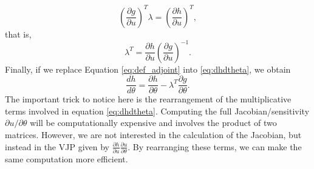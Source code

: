 \begin{equation}
    \left( \frac{\partial g}{\partial u}\right)^T \lambda =  \left( \frac{\partial h}{\partial u} \right)^T,
\end{equation}
that is,
\begin{equation}
    \lambda^T = \frac{\partial h}{\partial u} \left( \frac{\partial g}{\partial u} \right)^{-1}.
    \label{eq:def_adjoint}
\end{equation}
Finally, if we replace Equation \eqref{eq:def_adjoint} into \eqref{eq:dhdtheta}, we obtain 
\begin{equation}
    \frac{dh}{d\theta} 
    =
    \frac{\partial h}{\partial \theta} - \lambda^T \frac{\partial g}{\partial \theta}.
\end{equation}
The important trick to notice here is the rearrangement of the multiplicative terms involved in equation \eqref{eq:dhdtheta}. Computing the full Jacobian/sensitivity $\partial u / \partial \theta$ will be computationally expensive and involves the product of two matrices. However, we are not interested in the calculation of the Jacobian, but instead in the VJP given by $\frac{\partial h}{\partial u} \frac{\partial u}{\partial \theta}$. By rearranging these terms, we can make the same computation more efficient. 

